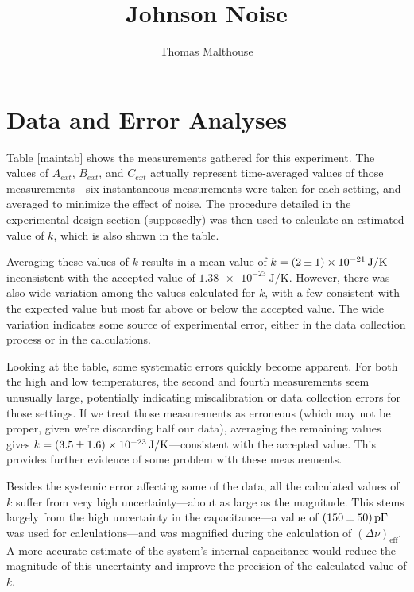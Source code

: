 \documentclass[%
 reprint,
superscriptaddress,
 amsmath,amssymb,
 aps,
]{revtex4-1}
\begin{document}

\title{Johnson Noise}%

\author{Thomas Malthouse}
%

\maketitle

\section{Data and Error Analyses}

Table \ref{maintab} shows the measurements gathered for this experiment. The values of $A_{ext}$, $B_{ext}$, and $C_{ext}$ actually represent time-averaged values of those measurements---six instantaneous measurements were taken for each setting, and averaged to minimize the effect of noise. The procedure detailed in the experimental design section (supposedly) was then used to calculate an estimated value of $k$, which is also shown in the table.

Averaging these values of $k$ results in a mean value of $k=\SI{2\pm1e-21}{\joule/\kelvin}$---inconsistent with the accepted value of $\SI{1.38e-23}{\joule/\kelvin}$. However, there was also wide variation among the values calculated for $k$, with a few consistent with the expected value but most far above or below the accepted value. The wide variation indicates some source of experimental error, either in the data collection process or in the calculations.

Looking at the table, some systematic errors quickly become apparent. For both the high and low temperatures, the second and fourth measurements seem unusually large, potentially indicating miscalibration or data collection errors for those settings. If we treat those measurements as erroneous (which may not be proper, given we're discarding half our data), averaging the remaining values gives $k=\SI{3.5\pm1.6e-23}{\joule/\kelvin}$---consistent with the accepted value. This provides further evidence of some problem with these measurements.

Besides the systemic error affecting some of the data, all the calculated values of $k$ suffer from very high uncertainty---about as large as the magnitude. This stems largely from the high uncertainty in the capacitance---a value of $\SI{150\pm50}{\pico\farad}$ was used for calculations---and was magnified during the calculation of $(\Delta \nu)_\text{eff}$. A more accurate estimate of the system's internal capacitance would reduce the magnitude of this uncertainty and improve the precision of the calculated value of $k$.
\end{document}

